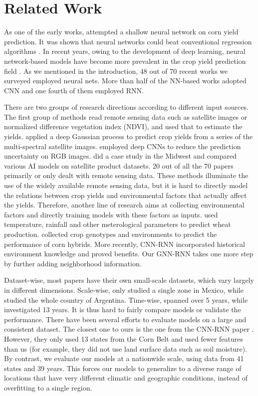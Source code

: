 \section{Related Work}
As one of the early works, \cite{liu2001neural} attempted a shallow neural network on corn yield prediction. It was shown that neural networks could beat conventional regression algorithms \cite{drummond2003statistical}. In recent years, owing to the development of deep learning, neural network-based models have become more prevalent in the crop yield prediction field \cite{dahikar2014agricultural,gandhi2016rice}. As we mentioned in the introduction, 48 out of 70 recent works we surveyed employed neural nets. More than half of the NN-based works adopted CNN and one fourth of them employed RNN. 

There are two groups of research directions according to different input sources. The first group of methods read remote sensing data such as satellite images or normalized difference vegetation index (NDVI), and used that to estimate the yields. \cite{you2017deep} applied a deep Gaussian process to predict crop yields from a series of the multi-spectral satellite images. \cite{nevavuori2019crop} employed deep CNNs to reduce the prediction uncertainty on RGB images. \cite{kim2019comparison} did a case study in the Midwest and compared various AI models on satellite product datasets. 20 out of all the 70 papers primarily or only dealt with remote sensing data.
These methods illuminate the use of the widely available remote sensing data, but it is hard to directly model the relations between crop yields and environmental factors that actually affect the yields.
Therefore, another line of research aims at collecting environmental factors and directly training models with these factors as inputs. \cite{ccakir2014yield} used temperature, rainfall and other meterological parameters to predict wheat production.  \cite{khaki2019crop} collected crop genotypes and environments to predict the performance of corn hybrids. More recently, CNN-RNN \cite{khaki2020cnn} incorporated historical environment knowledge and proved benefits. Our GNN-RNN takes one more step by further adding neighborhood information. 

Dataset-wise, most papers have their own small-scale datasets, which vary largely in different dimensions. Scale-wise, \cite{gonzalez2014predictive} only studied a single zone in Mexico, while \cite{wang2018deep} studied the whole country of Argentina. Time-wise, \cite{wang2018deep} spanned over 5 years, while \cite{you2017deep} investigated 13 years. It is thus hard to fairly compare models or validate the performance. There have been several efforts to evaluate models on a large and consistent dataset. The closest one to ours is the one from the CNN-RNN paper \cite{khaki2020cnn}. However, they only used 13 states from the Corn Belt and used fewer features than us (for example, they did not use land surface data such as soil moisture). By contrast, we evaluate our models at a nationwide scale, using data from 41 states and 39 years. This forces our models to generalize to a diverse range of locations that have very different climatic and geographic conditions, instead of overfitting to a single region.



